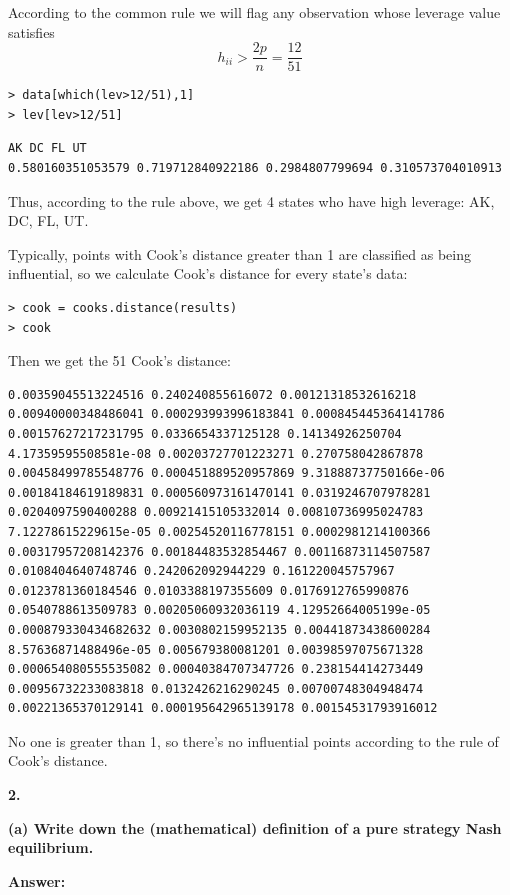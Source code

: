 \documentclass[letterpaper,11pt]{article}
\begin{document}
According to the common rule we will flag any observation whose leverage value satisfies
$$h_{ii} > \frac{2p}{n} = \frac{12}{51}$$

\begin{lstlisting}
> data[which(lev>12/51),1]
> lev[lev>12/51]
\end{lstlisting}

\begin{lstlisting}
AK DC FL UT
0.580160351053579 0.719712840922186 0.2984807799694 0.310573704010913
\end{lstlisting}

Thus, according to the rule above, we get 4 states who have high leverage: AK, DC, FL, UT.


Typically, points with Cook's distance greater than 1 are classified as being influential, so we calculate Cook's distance for every state's data:
\begin{lstlisting}
> cook = cooks.distance(results)
> cook
\end{lstlisting}
Then we get the 51 Cook's distance:
\begin{lstlisting}
0.00359045513224516 0.240240855616072 0.00121318532616218 0.00940000348486041 0.000293993996183841 0.000845445364141786 0.00157627217231795 0.0336654337125128 0.14134926250704 4.17359595508581e-08 0.00203727701223271 0.270758042867878 0.00458499785548776 0.000451889520957869 9.31888737750166e-06 0.00184184619189831 0.000560973161470141 0.0319246707978281 0.0204097590400288 0.00921415105332014 0.00810736995024783 7.12278615229615e-05 0.00254520116778151 0.0002981214100366 0.00317957208142376 0.00184483532854467 0.00116873114507587 0.0108404640748746 0.242062092944229 0.161220045757967 0.0123781360184546 0.0103388197355609 0.0176912765990876 0.0540788613509783 0.00205060932036119 4.12952664005199e-05 0.000879330434682632 0.0030802159952135 0.00441873438600284 8.57636871488496e-05 0.005679380081201 0.00398597075671328 0.000654080555535082 0.00040384707347726 0.238154414273449 0.00956732233083818 0.0132426216290245 0.00700748304948474 0.00221365370129141 0.000195642965139178 0.00154531793916012
\end{lstlisting}
No one is greater than 1, so there's no influential points according to the rule of Cook's distance.





\begin{addmargin}[-2em]{0em} \large{\textbf{2. }}\end{addmargin}
  \begin{addmargin}[-1.1em]{0em} \textbf{(a) Write down the (mathematical) definition of a pure strategy Nash equilibrium.}\par\end{addmargin}
    \textbf{}\par
  \bigbreak
  \begin{addmargin}[-0.5em]{0em}
  \textbf{Answer: }\end{addmargin}
\end{document}
